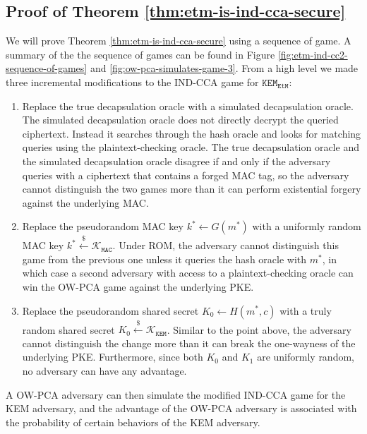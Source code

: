 \documentclass[runningheads]{llncs}
\newcommand{\kem}{\texttt{KEM}}
\newcommand{\etm}{\texttt{EtM}}  %
\newcommand{\mac}{\texttt{MAC}}
\newcommand{\leftsample}{\stackrel{\$}{\leftarrow}}
\begin{document}
\subsection{Proof of Theorem \ref{thm:etm-is-ind-cca-secure}}\label{sec:proof-of-etm-theorem}
We will prove Theorem \ref{thm:etm-is-ind-cca-secure} using a sequence of game. A summary of the the sequence of games can be found in Figure \ref{fig:etm-ind-cc2-sequence-of-games} and \ref{fig:ow-pca-simulates-game-3}. From a high level we made three incremental modifications to the IND-CCA game for $\kem_\etm$: \begin{enumerate}
    \item Replace the true decapsulation oracle with a simulated decapsulation oracle. The simulated decapsulation oracle does not directly decrypt the queried ciphertext. Instead it searches through the hash oracle and looks for matching queries using the plaintext-checking oracle. The true decapsulation oracle and the simulated decapsulation oracle disagree if and only if the adversary queries with a ciphertext that contains a forged MAC tag, so the adversary cannot distinguish the two games more than it can perform existential forgery against the underlying MAC.
    \item Replace the pseudorandom MAC key $k^\ast \leftarrow G(m^\ast)$ with a uniformly random MAC key $k^\ast \leftsample \mathcal{K}_\mac$. Under ROM, the adversary cannot distinguish this game from the previous one unless it queries the hash oracle with $m^\ast$, in which case a second adversary with access to a plaintext-checking oracle can win the OW-PCA game against the underlying PKE.
    \item Replace the pseudorandom shared secret $K_0 \leftarrow H(m^\ast, c)$ with a truly random shared secret $K_0 \leftsample \mathcal{K}_\kem$. Similar to the point above, the adversary cannot distinguish the change more than it can break the one-wayness of the underlying PKE. Furthermore, since both $K_0$ and $K_1$ are uniformly random, no adversary can have any advantage.
\end{enumerate}

A OW-PCA adversary can then simulate the modified IND-CCA game for the KEM adversary, and the advantage of the OW-PCA adversary is associated with the probability of certain behaviors of the KEM adversary.
\end{document}
